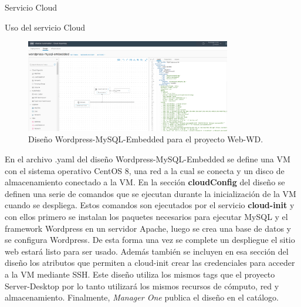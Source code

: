 \begin{subsection}{Servicio Cloud}
\begin{subsubsection}{Uso del servicio Cloud}
        \begin{figure}[h]
            \centering
            \includegraphics[width=0.8\textwidth]{imaxes/pruebaconcepto/vrealize/wordpress-mysql-blueprint.png}
            \caption{Diseño Wordpress-MySQL-Embedded para el proyecto Web-WD.}
            \label{fig:web-WD-blueprint}
        \end{figure}
        \FloatBarrier
        En el archivo .yaml del diseño Wordpress-MySQL-Embedded se define una VM con el sistema operativo CentOS 8, una red a la cual se conecta y un disco de almacenamiento conectado a la VM. En la sección \textbf{cloudConfig} del diseño se definen una serie de comandos que se ejecutan durante la inicialización de la VM cuando se despliega. Estos comandos son ejecutados por el servicio \textbf{cloud-init} y con ellos primero se instalan los paquetes necesarios para ejecutar MySQL y el framework Wordpress en un servidor Apache, luego se crea una base de datos y se configura Wordpress. De esta forma una vez se complete un despliegue el sitio web estará listo para ser usado. Además también se incluyen en esa sección del diseño los atributos que permiten a cloud-init crear las credenciales para acceder a la VM mediante SSH. Este diseño utiliza los mismos tags que el proyecto Server-Desktop por lo tanto utilizará los mismos recursos de cómputo, red y almacenamiento. Finalmente, \textit{Manager One} publica el diseño en el catálogo.        

\end{subsubsection}
\end{subsection}
